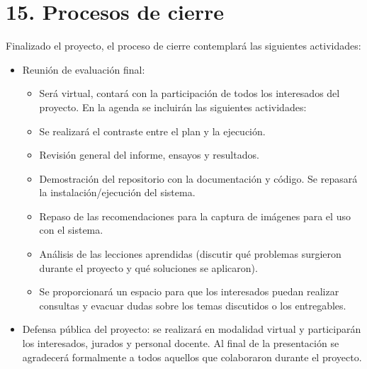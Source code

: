 \documentclass[
11pt %
]{charter}
\begin{document}
\newpage
\section{15. Procesos de cierre}    
\label{sec:cierre}

Finalizado el proyecto, el proceso de cierre contemplará las siguientes actividades:
\begin{itemize}
\item Reunión de evaluación final:
	\begin{itemize}
	\item Será virtual, contará con la participación de todos los
interesados del proyecto. En la agenda se incluirán las siguientes actividades:
	\item Se realizará el contraste entre el plan y la ejecución.
	\item Revisión general del informe, ensayos y resultados.
	\item Demostración del repositorio con la documentación y código. Se repasará la instalación/ejecución del sistema.
 	\item Repaso de las recomendaciones para la captura de imágenes para el uso con el sistema.
 	\item Análisis de las lecciones aprendidas (discutir qué problemas surgieron durante el
proyecto y qué soluciones se aplicaron).
 	\item Se proporcionará un espacio para que los interesados puedan realizar consultas y
evacuar dudas sobre los temas discutidos o los entregables.
	\end{itemize}
\item Defensa pública del proyecto:
se realizará en modalidad virtual y participarán los interesados, jurados y personal
docente. Al final de la presentación se agradecerá formalmente a todos aquellos que
colaboraron durante el proyecto.
\end{itemize}
\end{document}
